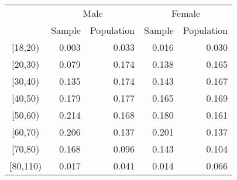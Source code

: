 \begin{table}[t]
\fontsize{12.0pt}{14.4pt}\selectfont
\begin{tabular*}{\linewidth}{@{\extracolsep{\fill}}crrrr}
\toprule
 & \multicolumn{2}{c}{Male} & \multicolumn{2}{c}{Female} \\ 
\cmidrule(lr){2-3} \cmidrule(lr){4-5}
 & Sample & Population & Sample & Population \\ 
\midrule\addlinespace[2.5pt]
[18,20) & 0.003 & 0.033 & 0.016 & 0.030 \\ 
[20,30) & 0.079 & 0.174 & 0.138 & 0.165 \\ 
[30,40) & 0.135 & 0.174 & 0.143 & 0.167 \\ 
[40,50) & 0.179 & 0.177 & 0.165 & 0.169 \\ 
[50,60) & 0.214 & 0.168 & 0.180 & 0.161 \\ 
[60,70) & 0.206 & 0.137 & 0.201 & 0.137 \\ 
[70,80) & 0.168 & 0.096 & 0.143 & 0.104 \\ 
[80,110) & 0.017 & 0.041 & 0.014 & 0.066 \\ 
\bottomrule
\end{tabular*}
\end{table}

